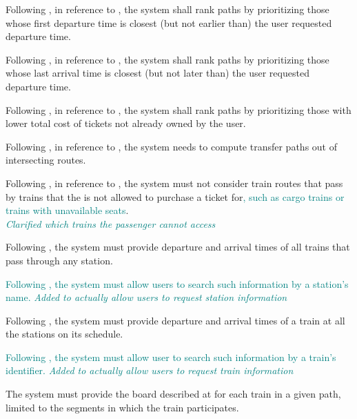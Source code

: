Following , in reference to , the system shall rank paths by prioritizing those whose first 
departure time is closest (but not earlier than) the user requested departure time.

Following , in reference to , the system shall rank paths by prioritizing those whose last 
arrival time is closest (but not later than) the user requested departure time.

Following , in reference to , the system shall rank paths by prioritizing those with lower total cost of 
tickets not already owned by the user.

Following , in reference to , the system needs to compute transfer paths out of intersecting routes.

Following , in reference to , the system must not consider train routes that pass by trains that the  is not allowed to purchase a ticket for\textcolor{teal}{, such as cargo trains or trains with unavailable seats}.\\
\textit{\textcolor{teal}{Clarified which trains the passenger cannot access}}

Following , the system must provide departure and arrival times of all trains that pass through any station.

\textcolor{teal}{
	Following , the system must allow users to search such information by a station's name.
	\newline
	\it{Added to actually allow users to request station information}
}

Following , the system must provide departure and arrival times of a train at all the stations on its schedule.

\textcolor{teal}{
	Following , the system must allow user to search such information by a train's identifier.
	\newline
	\it{Added to actually allow users to request train information}
}

The system must provide the board described at  for each train in a given path, limited to the segments in which the train participates.

